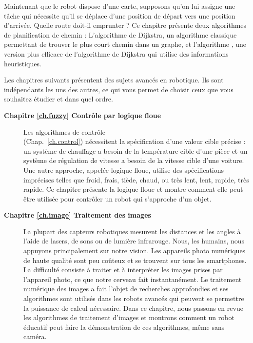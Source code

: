 {\begin{description}
\smallskip
\item [\textbf{Chapitre \ref{ch.map-based} Navigation basée sur la cartographie}] Maintenant que le robot dispose d'une carte, supposons qu'on lui assigne une tâche qui nécessite qu'il se déplace d'une position de départ vers une position d'arrivée. Quelle route doit-il emprunter ? Ce chapitre présente deux algorithmes de planification de chemin : L'algorithme de Dijkstra, un algorithme classique permettant de trouver le plus court chemin dans un graphe, et l'algorithme \astar{}, 
une version plus efficace de l'algorithme de Dijkstra qui utilise des informations heuristiques.
\end{description}

Les chapitres suivants présentent des sujets avancés en robotique. Ils sont indépendants les uns des autres, ce qui vous permet de choisir ceux que vous souhaitez étudier et dans quel ordre.
\begin{description}
\item [\textbf{Chapitre \ref{ch.fuzzy} Contrôle par logique floue}]
Les algorithmes de contrôle\\(Chap.~\ref{ch.control}) nécessitent la spécification d'une valeur cible précise : un système de chauffage a besoin de la température cible d'une pièce et un système de régulation de vitesse a besoin de la vitesse cible d'une voiture. Une autre approche, appelée logique floue, utilise des spécifications imprécises telles que froid, frais, tiède, chaud, ou très lent, lent, rapide, très rapide. Ce chapitre présente la logique floue et montre comment elle peut être utilisée pour contrôler un robot qui s'approche d'un objet.
\smallskip
\item [\textbf{Chapitre \ref{ch.image} Traitement des images}] La plupart des capteurs robotiques mesurent les distances et les angles à l'aide de lasers, de sons ou de lumière infrarouge. Nous, les humains, nous appuyons principalement sur notre vision. Les appareils photo numériques de haute qualité sont peu coûteux et se trouvent sur tous les smartphones. La difficulté consiste à traiter et à interpréter les images prises par l'appareil photo, ce que notre cerveau fait instantanément. Le traitement numérique des images a fait l'objet de recherches approfondies et ses algorithmes sont utilisés dans les robots avancés qui peuvent se permettre la puissance de calcul nécessaire. Dans ce chapitre, nous passons en revue les algorithmes de traitement d'images et montrons comment un robot éducatif peut faire la démonstration de ces algorithmes, même sans caméra.

\end{description}}
